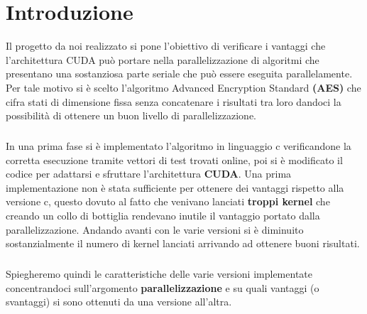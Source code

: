 \chapter{Introduzione}
Il progetto da noi realizzato si pone l'obiettivo di verificare i vantaggi che l'architettura CUDA può portare nella parallelizzazione di algoritmi che presentano una sostanziosa parte seriale che può essere eseguita parallelamente. Per tale motivo si è scelto l'algoritmo Advanced Encryption Standard \textbf{(AES)} che cifra stati di dimensione fissa senza concatenare i risultati tra loro dandoci la possibilità di ottenere un buon livello di parallelizzazione.

\paragraph{}In una prima fase si è implementato l'algoritmo in linguaggio c verificandone la corretta esecuzione tramite vettori di test trovati online, poi si è modificato il codice per adattarsi e sfruttare l'architettura \textbf{CUDA}. Una prima implementazione non è stata sufficiente per ottenere dei vantaggi rispetto alla versione c, questo dovuto al fatto che venivano lanciati \textbf{troppi kernel} che creando un collo di bottiglia rendevano inutile il vantaggio portato dalla parallelizzazione. Andando avanti con le varie versioni si è diminuito sostanzialmente il numero di kernel lanciati arrivando ad ottenere buoni risultati.

\paragraph{} Spiegheremo quindi le caratteristiche delle varie versioni implementate concentrandoci sull'argomento \textbf{parallelizzazione} e su quali vantaggi (o svantaggi) si sono ottenuti da una versione all'altra.